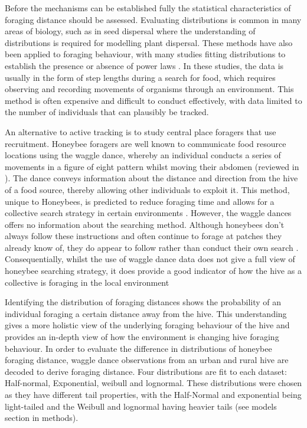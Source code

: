 \documentclass[11pt]{article}
\begin{document}
\begin{linenumbers}
Before the mechanisms can be established fully the statistical characteristics of foraging distance should be assessed. Evaluating distributions is common in many areas of biology, such as in seed dispersal \citep{Bullock2017} where the understanding of distributions is required for modelling plant dispersal. These methods have also been applied to foraging behaviour, with many studies fitting distributions to establish the presence or absence of power laws \citep{Humphries2010, Breed2015, Murphy2007}. In these studies, the data is usually in the form of step lengths during a search for food, which requires observing and recording movements of organisms through an environment. This method is often expensive and difficult to conduct effectively, with data limited to the number of individuals that can plausibly be tracked.\par

An alternative to active tracking is to study central place foragers that use recruitment. Honeybee foragers are well known to communicate food resource locations using the waggle dance, whereby an individual conducts a series of movements in a figure of eight pattern whilst moving their abdomen (reviewed in \cite{Dyer2002}). The dance conveys information about the distance and direction from the hive of a food source, thereby allowing other individuals to exploit it. This method, unique to Honeybees, is predicted to reduce foraging time and allows for a collective search strategy in certain environments \citep{Schurch2014}. However, the waggle dances offers no information about the searching method. Although honeybees don't always follow these instructions and often continue to forage at patches they already know of, they do appear to follow rather than conduct their own search \citep{Wray2012}. Consequentially, whilst the use of waggle dance data does not give a full view of honeybee searching strategy, it does provide a good indicator of how the hive as a collective is foraging in the local environment\par

Identifying the distribution of foraging distances shows the probability of an individual foraging a certain distance away from the hive. This understanding gives a more holistic view of the underlying foraging behaviour of the hive and provides an in-depth view of how the environment is changing hive foraging behaviour. In order to evaluate the difference in distributions of honeybee foraging distance, waggle dance observations from an urban and rural hive are decoded to derive foraging distance. Four distributions are fit to each dataset: Half-normal, Exponential, weibull and lognormal. These distributions were chosen as they have different tail properties, with the Half-Normal and exponential being light-tailed and the Weibull and lognormal having heavier tails (see models section in methods).\par


\end{linenumbers}
\end{document}
